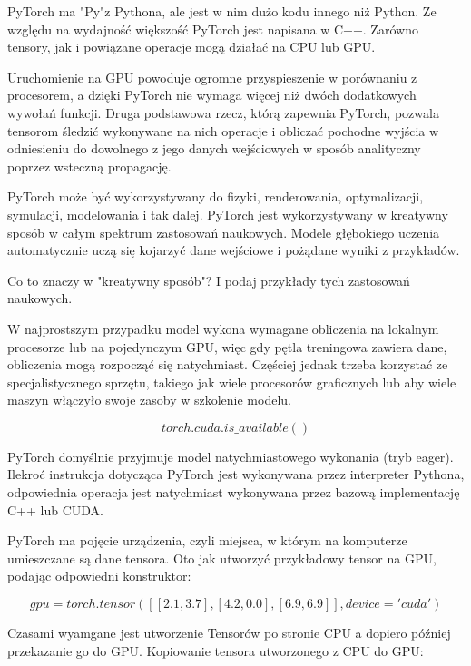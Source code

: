\documentclass[brudnopis]{xmgr}
\begin{document}
PyTorch ma "Py"z Pythona, ale jest w nim dużo kodu innego niż Python. 
Ze względu na wydajność większość PyTorch jest napisana w C++. 
Zarówno tensory, jak i powiązane operacje mogą działać na CPU lub GPU. 

Uruchomienie na GPU powoduje ogromne przyspieszenie w porównaniu z procesorem, a dzięki PyTorch nie wymaga więcej niż dwóch dodatkowych wywołań funkcji. Druga podstawowa rzecz, którą zapewnia PyTorch, pozwala tensorom śledzić wykonywane na nich operacje i obliczać pochodne wyjścia w odniesieniu do dowolnego z jego danych wejściowych w sposób analityczny poprzez wsteczną propagację. 

PyTorch może być wykorzystywany do fizyki, renderowania, optymalizacji, symulacji, modelowania i tak dalej. PyTorch jest wykorzystywany w kreatywny sposób w całym spektrum zastosowań naukowych. Modele głębokiego uczenia automatycznie uczą się kojarzyć dane wejściowe i pożądane wyniki z przykładów.

Co to znaczy w "kreatywny sposób"? I podaj przykłady tych zastosowań naukowych.

W najprostszym przypadku model wykona wymagane obliczenia na lokalnym procesorze lub na pojedynczym GPU, więc gdy pętla treningowa zawiera dane, obliczenia mogą rozpocząć się natychmiast. Częściej jednak trzeba korzystać ze specjalistycznego sprzętu, takiego jak wiele procesorów graficznych lub aby wiele maszyn włączyło swoje zasoby w szkolenie modelu. 

\begin{equation}
torch.cuda.is\_available()
\end{equation}



PyTorch domyślnie przyjmuje model natychmiastowego wykonania (tryb eager).
Ilekroć instrukcja dotycząca PyTorch jest wykonywana przez interpreter Pythona, odpowiednia operacja jest natychmiast wykonywana przez bazową implementację C++ lub CUDA. 


PyTorch ma pojęcie urządzenia, czyli miejsca, w którym na komputerze umieszczane są dane tensora. Oto jak utworzyć przykładowy tensor na GPU, podając odpowiedni konstruktor:

\begin{equation}
gpu = torch.tensor([[2.1, 3.7], [4.2, 0.0], [6.9, 6.9]], device='cuda')
\end{equation}

Czasami wyamgane jest utworzenie Tensorów po stronie CPU a dopiero później przekazanie go do GPU. Kopiowanie tensora utworzonego z CPU do GPU:
\end{document}

